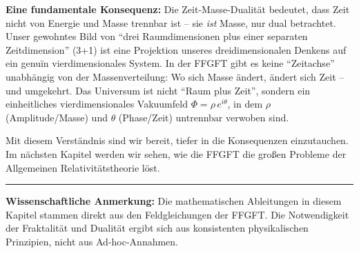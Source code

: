 \textbf{Eine fundamentale Konsequenz:} Die Zeit-Masse-Dualität bedeutet, dass Zeit nicht von Energie und Masse trennbar ist -- sie \textit{ist} Masse, nur dual betrachtet. Unser gewohntes Bild von \enquote{drei Raumdimensionen plus einer separaten Zeitdimension} (3+1) ist eine Projektion unseres dreidimensionalen Denkens auf ein genuïn vierdimensionales System. In der FFGFT gibt es keine \enquote{Zeitachse} unabhängig von der Massenverteilung: Wo sich Masse ändert, ändert sich Zeit -- und umgekehrt. Das Universum ist nicht \enquote{Raum plus Zeit}, sondern ein einheitliches vierdimensionales Vakuumfeld $\Phi = \rho\, e^{i\theta}$, in dem $\rho$ (Amplitude/Masse) und $\theta$ (Phase/Zeit) untrennbar verwoben sind.

Mit diesem Verständnis sind wir bereit, tiefer in die Konsequenzen einzutauchen. Im nächsten Kapitel werden wir sehen, wie die FFGFT die großen Probleme der Allgemeinen Relativitätstheorie löst.

\vspace{1cm}
\hrule
\vspace{0.5cm}
\noindent\textbf{Wissenschaftliche Anmerkung:} Die mathematischen Ableitungen in diesem Kapitel stammen direkt aus den Feldgleichungen der FFGFT. Die Notwendigkeit der Fraktalität und Dualität ergibt sich aus konsistenten physikalischen Prinzipien, nicht aus Ad-hoc-Annahmen.



